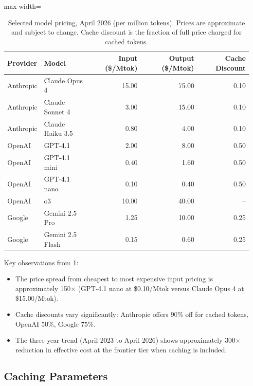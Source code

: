 \documentclass[11pt, a4paper, logo, copyright]{googledeepmind}
\begin{document}
\begin{table}[t]
\centering
\caption{Selected model pricing, April 2026 (per million tokens). Prices are approximate and subject to change. Cache discount is the fraction of full price charged for cached tokens.}
\label{tab:pricing}
\begin{adjustbox}{max width=\textwidth}
\begin{tabular}{llrrr}
\toprule
\textbf{Provider} & \textbf{Model} & \textbf{Input (\$/Mtok)} & \textbf{Output (\$/Mtok)} & \textbf{Cache Discount} \\
\midrule
Anthropic & Claude Opus 4 & 15.00 & 75.00 & 0.10 \\
Anthropic & Claude Sonnet 4 & 3.00 & 15.00 & 0.10 \\
Anthropic & Claude Haiku 3.5 & 0.80 & 4.00 & 0.10 \\
\midrule
OpenAI & GPT-4.1 & 2.00 & 8.00 & 0.50 \\
OpenAI & GPT-4.1 mini & 0.40 & 1.60 & 0.50 \\
OpenAI & GPT-4.1 nano & 0.10 & 0.40 & 0.50 \\
OpenAI & o3 & 10.00 & 40.00 & -- \\
\midrule
Google & Gemini 2.5 Pro & 1.25 & 10.00 & 0.25 \\
Google & Gemini 2.5 Flash & 0.15 & 0.60 & 0.25 \\
\bottomrule
\end{tabular}
\end{adjustbox}
\end{table}

Key observations from \cref{tab:pricing}:
\begin{itemize}[nosep]
    \item The price spread from cheapest to most expensive input pricing is approximately 150$\times$ (GPT-4.1 nano at \$0.10/Mtok versus Claude Opus 4 at \$15.00/Mtok).
    \item Cache discounts vary significantly: Anthropic offers 90\% off for cached tokens, OpenAI 50\%, Google 75\%.
    \item The three-year trend (April 2023 to April 2026) shows approximately 300$\times$ reduction in effective cost at the frontier tier when caching is included.
\end{itemize}

\subsection{Caching Parameters}
\end{document}

